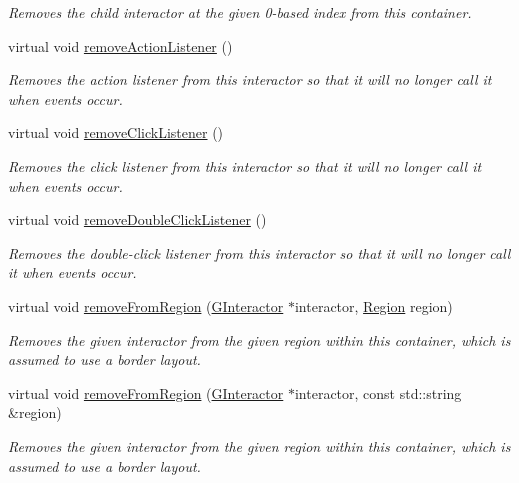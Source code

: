 \begin{DoxyCompactItemize}
\begin{DoxyCompactList}\small\item\em Removes the child interactor at the given 0-\/based index from this container. \end{DoxyCompactList}\item 
virtual void \mbox{\hyperlink{classGInteractor_ab7fe7a876367b87cf7202f947f1d05e4}{remove\+Action\+Listener}} ()
\begin{DoxyCompactList}\small\item\em Removes the action listener from this interactor so that it will no longer call it when events occur. \end{DoxyCompactList}\item 
virtual void \mbox{\hyperlink{classGInteractor_ad39d0325cde6b97ebda4b9d7787c633b}{remove\+Click\+Listener}} ()
\begin{DoxyCompactList}\small\item\em Removes the click listener from this interactor so that it will no longer call it when events occur. \end{DoxyCompactList}\item 
virtual void \mbox{\hyperlink{classGInteractor_aa4250907e4cdd77349c04f0cf5cdd3d3}{remove\+Double\+Click\+Listener}} ()
\begin{DoxyCompactList}\small\item\em Removes the double-\/click listener from this interactor so that it will no longer call it when events occur. \end{DoxyCompactList}\item 
virtual void \mbox{\hyperlink{classGContainer_a87a74b040025878283ba685e30d5104f}{remove\+From\+Region}} (\mbox{\hyperlink{classGInteractor}{G\+Interactor}} $\ast$interactor, \mbox{\hyperlink{classGContainer_a81a01a86de31071a92e6cce0bab9bc4b}{Region}} region)
\begin{DoxyCompactList}\small\item\em Removes the given interactor from the given region within this container, which is assumed to use a border layout. \end{DoxyCompactList}\item 
virtual void \mbox{\hyperlink{classGContainer_a16268c8344a5a5d9b10bde95764112d1}{remove\+From\+Region}} (\mbox{\hyperlink{classGInteractor}{G\+Interactor}} $\ast$interactor, const std\+::string \&region)
\begin{DoxyCompactList}\small\item\em Removes the given interactor from the given region within this container, which is assumed to use a border layout. \end{DoxyCompactList}\item 

\end{DoxyCompactItemize}
